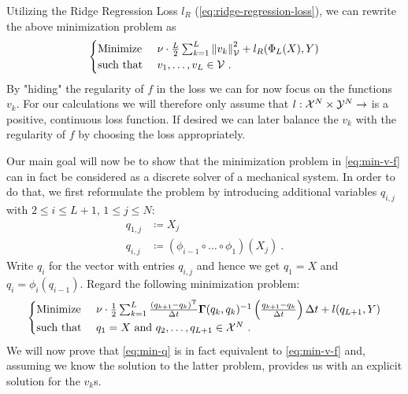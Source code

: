 Utilizing the Ridge Regression Loss $l_R$ (\cref{eq:ridge-regression-loss}), we can rewrite the above minimization problem as
\begin{equation}
	\begin{cases}
		\text{Minimize~} & \nu \cdot \frac{L}{2} \sum_{k=1}^{L} \norm{v_k}_\mathcal{V}^2
		+ l_R(\Phi_L(X), Y) \\
		\text{such that~} & v_1, \ldots, v_L \in \mathcal{V}\ .
	\end{cases}
\end{equation}
By "hiding" the regularity of $f$ in the loss we can for now focus on the functions $v_k$.
For our calculations we will therefore only assume that $l: \mathcal{X}^N \times \mathcal{Y}^N \rightarrow$ is a positive, continuous loss function.
If desired we can later balance the $v_k$ with the regularity of $f$ by choosing the loss appropriately.

Our main goal will now be to show that the minimization problem in \cref{eq:min-v-f} can in fact be considered as a discrete solver of a mechanical system.
In order to do that, we first reformulate the problem by introducing additional variables $q_{i,j}$ with $2 \leq i \leq L+1$, $1 \leq j \leq N$:
\begin{align}
	q_{1, j} &\coloneqq X_j \, \\
	q_{i, j} &\coloneqq (\phi_{i-1} \circ \ldots \circ \phi_1) (X_j) \ .
\end{align}
Write $q_i$ for the vector with entries $q_{i,j}$ and hence we get $q_1 = X$ and $q_i = \phi_i(q_{i-1})$.
Regard the following minimization problem:
\begin{equation}
	\label{eq:min-q}
	\begin{cases}
		\text{Minimize~} & \nu \cdot \frac{1}{2} \sum_{k=1}^{L} \frac{(q_{k+1} - q_k)^\mathrm{T}}{\Delta t} \mathbf{\Gamma}(q_k, q_k)^{-1} \left(\frac{q_{k+1} - q_k}{\Delta t}\right) \Delta t+ l(q_{L+1}, Y) \\
		\text{such that~} & q_1 = X \text{~and~} q_2, \ldots, q_{L+1} \in \mathcal{X}^N \ .
	\end{cases}
\end{equation}
We will now prove that \cref{eq:min-q} is in fact equivalent to \cref{eq:min-v-f} and, assuming we know the solution to the latter problem, provides us with an explicit solution for the $v_k$s.


